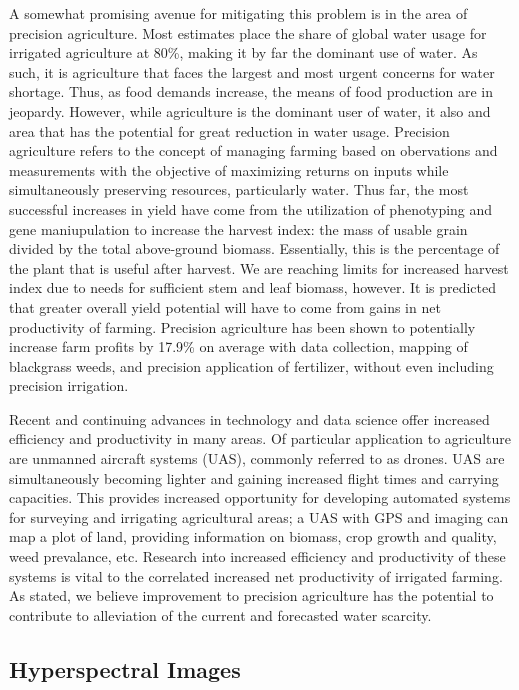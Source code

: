 A somewhat promising avenue for mitigating this problem is in the area of precision agriculture.
Most estimates place the share of global water usage for irrigated agriculture at 80\%, making it by far the dominant use of water.
As such, it is agriculture that faces the largest and most urgent concerns for water shortage.
Thus, as food demands increase, the means of food production are in jeopardy.
However, while agriculture is the dominant user of water, it also and area that has the potential for great reduction in water usage.
Precision agriculture refers to the concept of managing farming based on obervations and measurements with the objective of maximizing returns on inputs while simultaneously preserving resources, particularly water.
Thus far, the most successful increases in yield have come from the utilization of phenotyping and gene maniupulation to increase the harvest index: the mass of usable grain divided by the total above-ground biomass.
Essentially, this is the percentage of the plant that is useful after harvest.
We are reaching limits for increased harvest index due to needs for sufficient stem and leaf biomass, however.
It is predicted that greater overall yield potential will have to come from gains in net productivity of farming.
Precision agriculture has been shown to potentially increase farm profits by 17.9\% on average with data collection, mapping of blackgrass weeds, and precision application of fertilizer, without even including precision irrigation.


Recent and continuing advances in technology and data science offer increased efficiency and productivity in many areas.
Of particular application to agriculture are unmanned aircraft systems (UAS), commonly referred to as drones.
UAS are simultaneously becoming lighter and gaining increased flight times and carrying capacities.
This provides increased opportunity for developing automated systems for surveying and irrigating agricultural areas; a UAS with GPS and imaging can map a plot of land, providing information on biomass, crop growth and quality, weed prevalance, etc.
Research into increased efficiency and productivity of these systems is vital to the correlated increased net productivity of irrigated farming.
As stated, we believe improvement to precision agriculture has the potential to contribute to alleviation of the current and forecasted water scarcity.





\subsection{Hyperspectral Images}

